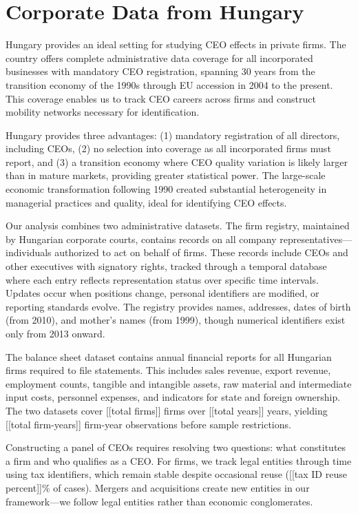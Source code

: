 \documentclass[11pt,a4paper]{article}
\begin{document}
\section{Corporate Data from Hungary}

Hungary provides an ideal setting for studying CEO effects in private firms. The country offers complete administrative data coverage for all incorporated businesses with mandatory CEO registration, spanning 30 years from the transition economy of the 1990s through EU accession in 2004 to the present. This coverage enables us to track CEO careers across firms and construct mobility networks necessary for identification.

Hungary provides three advantages: (1) mandatory registration of all directors, including CEOs, (2) no selection into coverage as all incorporated firms must report, and (3) a transition economy where CEO quality variation is likely larger than in mature markets, providing greater statistical power. The large-scale economic transformation following 1990 created substantial heterogeneity in managerial practices and quality, ideal for identifying CEO effects. 

Our analysis combines two administrative datasets. The firm registry, maintained by Hungarian corporate courts, contains records on all company representatives—individuals authorized to act on behalf of firms. These records include CEOs and other executives with signatory rights, tracked through a temporal database where each entry reflects representation status over specific time intervals. Updates occur when positions change, personal identifiers are modified, or reporting standards evolve. The registry provides names, addresses, dates of birth (from 2010), and mother's names (from 1999), though numerical identifiers exist only from 2013 onward.

The balance sheet dataset contains annual financial reports for all Hungarian firms required to file statements. This includes sales revenue, export revenue, employment counts, tangible and intangible assets, raw material and intermediate input costs, personnel expenses, and indicators for state and foreign ownership. The two datasets cover [[total firms]] firms over [[total years]] years, yielding [[total firm-years]] firm-year observations before sample restrictions.

Constructing a panel of CEOs requires resolving two questions: what constitutes a firm and who qualifies as a CEO. For firms, we track legal entities through time using tax identifiers, which remain stable despite occasional reuse ([[tax ID reuse percent]]\% of cases). Mergers and acquisitions create new entities in our framework—we follow legal entities rather than economic conglomerates.
\end{document}
